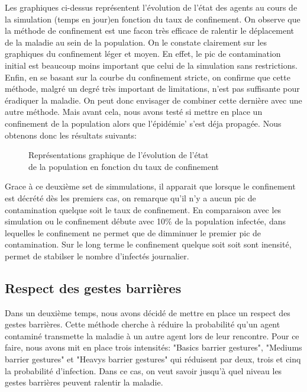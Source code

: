 \documentclass[a4paper, 12pt]{report}
\begin{document}
Les graphiques ci-dessus représentent l'évolution de l'état des agents au cours de la simulation (temps en jour)en fonction du taux de confinement.
On observe que la méthode de confinement est une facon très efficace de ralentir le déplacement de la maladie au sein de la population. On le constate clairement
sur les graphiques du confinement léger et moyen. En effet, le pic de contamination initial est beaucoup moins important que celui de la simulation sans restrictions.
Enfin, en se basant sur la courbe du confinement stricte, on confirme que cette méthode, malgré un degré très important de limitations, n'est pas suffisante pour éradiquer la maladie.
On peut donc envisager de combiner cette dernière avec une autre méthode. Mais avant cela, nous avons testé si mettre en place un confinement de la population alors que l'épidémie' s'est déja propagée.
Nous obtenons donc les résultats suivants:

\begin{figure}[h]
	\centering
	\qquad
	\centering
	\qquad
	\caption{Représentations graphique de l'évolution de l'état\\ de la population en fonction du taux de confinement}

\end{figure}

Grace à ce deuxième set de simmulations, il apparait que lorsque le confinement est décrété dès les premiers cas, on remarque qu'il n'y a aucun pic de contamination quelque soit le taux de confinement.
En comparaison avec les simulation ou le confinement débute avec 10\% de la population infectée, dans lequelles le confinement ne permet que
de dimminuer le premier pic de contamination. Sur le long terme le confinement quelque soit soit sont inensité, permet de stabilser le nombre d'infectés journalier.

\newpage

\subsection{Respect des gestes barrières}
Dans un deuxième temps, nous avons décidé de mettre en place un respect des gestes barrières. Cette méthode cherche à réduire la probabilité qu'un agent contaminé transmette la maladie à un autre agent
lors de leur rencontre. Pour ce faire, nous avons mit en place trois intensités: "Basics barrier gestures", "Mediums barrier gestures" et "Heavys barrier gestures" qui réduisent par deux, trois et cinq
la probabilité d'infection. Dans ce cas, on veut savoir jusqu'à quel niveau les gestes barrières peuvent ralentir la maladie.
\end{document}
